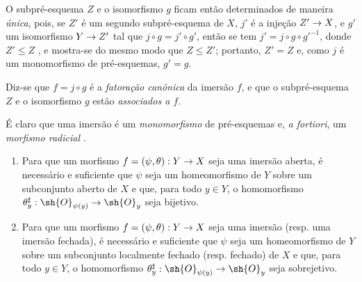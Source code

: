 \documentclass[oneside]{amsart}
\makeatletter
\renewcommand{\leq}{\leqslant}
\newcommand{\ega@arrow}[2]{\mathchoice{#1}{#2}{#2}{#2}}
\renewcommand{\to}{\ega@arrow{\longrightarrow}{\rightarrow}}
\let\EGAOriginalLabel\label
\renewcommand{\label}[1]{\phantomsection\EGAOriginalLabel{#1}}
\makeatother
\begin{document}
O subpré-esquema $Z$ e o isomorfismo $g$ ficam então determinados de maneira \emph{única}, pois, se $Z'$ é um segundo subpré-esquema de $X$, $j'$ é a injeção $Z'\to X$, e $g'$ um isomorfismo $Y\to Z'$ tal que $j\circ g=j'\circ g'$, então se tem $j'=j\circ g\circ{g'}^{-1}$, donde $Z'\leq Z$ , e mostra-se do mesmo modo que $Z\leq Z'$; portanto, $Z'=Z$ e, como $j$ é um monomorfismo de pré-esquemas, $g'=g$.

Diz-se que $f=j\circ g$ é a \emph{fatoração canônica} da imersão $f$, e que o subpré-esquema $Z$ e o isomorfismo $g$ estão \emph{associados a $f$}.

É claro que uma imersão é um \emph{monomorfismo} de pré-esquemas  e, \emph{a fortiori}, um \emph{morfismo radicial} .

\begin{proposition}[4.2.2]
\label{I.4.2.2}
\medskip\noindent
\begin{enumerate}
  \item[{\rm(a)}] Para que um morfismo $f=(\psi,\theta):Y\to X$ seja uma imersão aberta, é necessário e suficiente que $\psi$ seja um homeomorfismo de $Y$ sobre um subconjunto aberto de $X$ e que, para todo $y\in Y$, o homomorfismo $\theta_y^\sharp:\sh{O}_{\psi(y)}\to\sh{O}_y$ seja bijetivo.
  \item[{\rm(b)}] Para que um morfismo $f=(\psi,\theta):Y\to X$ seja uma imersão (resp. uma imersão fechada), é necessário e suficiente que $\psi$ seja um homeomorfismo de $Y$ sobre um subconjunto localmente fechado (resp. fechado) de $X$ e que, para todo $y\in Y$, o homomorfismo $\theta_y^\sharp:\sh{O}_{\psi(y)}\to\sh{O}_y$ seja sobrejetivo.
\end{enumerate}
\end{proposition}
\end{document}
